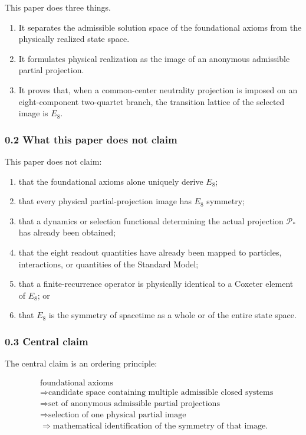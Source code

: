 \documentclass[
  a4paper,
]{article}
\providecommand{\tightlist}{%
  \setlength{\itemsep}{0pt}\setlength{\parskip}{0pt}}
\begin{document}
This paper does three things.

\begin{enumerate}
\def\labelenumi{\arabic{enumi}.}
\tightlist
\item
  It separates the admissible solution space of the foundational axioms
  from the physically realized state space.
\item
  It formulates physical realization as the image of an anonymous
  admissible partial projection.
\item
  It proves that, when a common-center neutrality projection is imposed
  on an eight-component two-quartet branch, the transition lattice of
  the selected image is \(E_8\).
\end{enumerate}

\subsubsection{0.2 What this paper does not
claim}\label{what-this-paper-does-not-claim}

This paper does not claim:

\begin{enumerate}
\def\labelenumi{\arabic{enumi}.}
\tightlist
\item
  that the foundational axioms alone uniquely derive \(E_8\);
\item
  that every physical partial-projection image has \(E_8\) symmetry;
\item
  that a dynamics or selection functional determining the actual
  projection \(\mathcal P_*\) has already been obtained;
\item
  that the eight readout quantities have already been mapped to
  particles, interactions, or quantities of the Standard Model;
\item
  that a finite-recurrence operator is physically identical to a Coxeter
  element of \(E_8\); or
\item
  that \(E_8\) is the symmetry of spacetime as a whole or of the entire
  state space.
\end{enumerate}

\subsubsection{0.3 Central claim}\label{central-claim}

The central claim is an ordering principle:

\[
\boxed{
\begin{aligned}
&\text{foundational axioms}\\
&\Longrightarrow
\text{candidate space containing multiple admissible closed systems}\\
&\Longrightarrow
\text{set of anonymous admissible partial projections}\\
&\Longrightarrow
\text{selection of one physical partial image}\\
&\Longrightarrow
\text{mathematical identification of the symmetry of that image}.
\end{aligned}
}
\]
\end{document}
